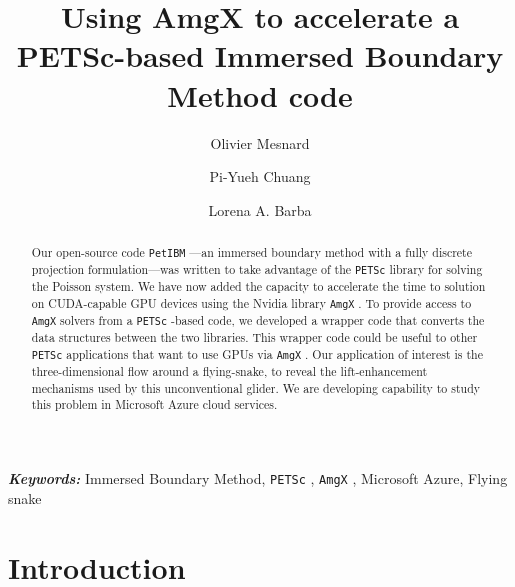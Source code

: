\documentclass[10pt]{article}
\newcommand{\petibm}{\texttt{PetIBM} }
\newcommand{\petsc}{\texttt{PETSc} }
\newcommand{\amgx}{\texttt{AmgX} }
\providecommand{\keywords}[1]{\textbf{\textit{Keywords:}} #1}
\begin{document}
\title{Using AmgX to accelerate a PETSc-based Immersed Boundary Method code}

\author[1]{Olivier Mesnard}
\author[1]{Pi-Yueh Chuang}
\author[1]{Lorena A. Barba}
\maketitle

\begin{abstract}
Our open-source code \petibm---an immersed boundary method with a fully discrete projection formulation---was written to take advantage of the \petsc library for solving the Poisson system. 
We have now added the capacity to accelerate the time to solution on CUDA-capable GPU devices using the Nvidia library \amgx.
To provide access to \amgx solvers from a \petsc-based code, we developed a wrapper code that converts the data structures between the two libraries.
This wrapper code could be useful to other \petsc applications that want to use GPUs via \amgx.
Our application of interest is the three-dimensional flow around a  flying-snake,  to reveal the lift-enhancement mechanisms used by this unconventional glider.
We are developing capability to study this problem in Microsoft Azure cloud services.
\end{abstract}

\keywords{Immersed Boundary Method, \petsc, \amgx, Microsoft Azure, Flying snake}

\linenumbers

\section{Introduction}
\end{document}
